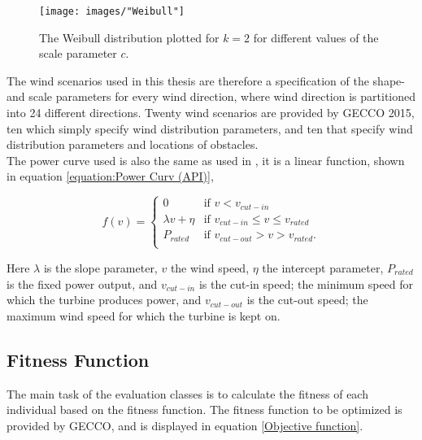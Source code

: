 \begin{figure}[h!]
\begin{center}
\texttt{[image: images/"Weibull"]}
\caption{The Weibull distribution plotted for $k = 2$ for different values of the scale parameter $c$.}
\label{figure:weibull distribution}
\end{center}
\end{figure}

\noindent The wind scenarios used in this thesis are therefore a specification of the shape- and scale parameters for every wind direction, where wind direction is partitioned into 24 different directions. Twenty wind scenarios are provided by GECCO 2015, ten which simply specify wind distribution parameters, and ten that specify wind distribution parameters and locations of obstacles. \\

\noindent The power curve used is also the same as used in \cite{Kusiak}, it is a linear function, shown in equation \ref{equation:Power Curv (API)},

\begin{equation}
 f(v) = 
  \begin{cases} 
   0                                  & \text{if }     v < v_{cut-in} \\
   \lambda v + \eta           & \text{if }     v_{cut-in} \leq v \leq v_{rated} \\
   P_{rated}                        & \text{if }     v_{cut-out} > v > v_{rated}. \\
  \end{cases}
  \label{equation:Power Curv (API)}
\end{equation}

\noindent Here $\lambda$ is the slope parameter, $v$ the wind speed, $\eta$ the intercept parameter, $P_{rated}$ is the fixed power output, and $v_{cut-in}$ is the cut-in speed; the minimum speed for which the turbine produces power, and $v_{cut-out}$ is the cut-out speed; the maximum wind speed for which the turbine is kept on. 


\subsection{Fitness Function}\label{subsection:fitness function}
The main task of the evaluation classes is to calculate the fitness of each individual based on the fitness function.  The fitness function to be optimized is provided by GECCO, and is displayed in equation \ref{Objective function}.\\

